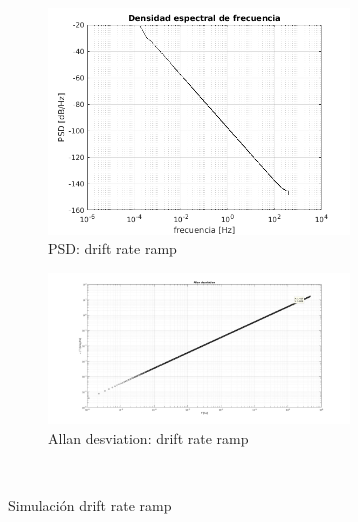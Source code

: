 \documentclass[a4paper,11pt,twoside]{IT-CNEA}
\begin{document}
\begin{figure}[t!]
    \centering
    \begin{subfigure}[t]{0.5\textwidth}
        \centering
        \includegraphics[width=8cm]{Figuras/PSDRR.png}
        \caption{PSD: drift rate ramp}
        \label{fig:}
    \end{subfigure}%
    \begin{subfigure}[t]{0.5\textwidth}
        \centering
        \includegraphics[width=8cm]{Figuras/AllanRR.png}
        \caption{Allan desviation: drift rate ramp}
        \label{fig:}
    \end{subfigure}%
    ~ 
    \caption{Simulación drift rate ramp}
    \label{fig:simulacionRR}
\end{figure}
\end{document}
